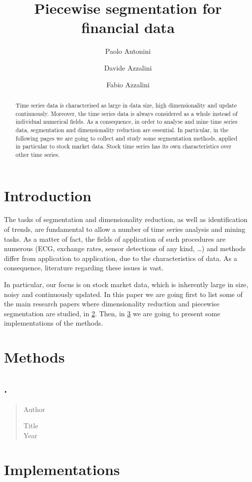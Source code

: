\documentclass[a4paper]{article}
\title{Piecewise segmentation for financial data}
\author{Paolo Antonini \and Davide Azzalini \and Fabio Azzalini}
\date{}
\newcommand{\newpaper}[1]{\subsection{\cite{#1}. \citetitle{#1}}

\begin{framed}\begin{quote}\begin{description}
	\item [Author]\citeauthor{#1}
	\item [Title]\citetitle{#1}
	\item [Year]\citedate{#1}
\end{description}\end{quote}\end{framed}}
\begin{document}
\maketitle
\begin{abstract}
Time series data is characterised as large in data size, high dimensionality and update continuously. Moreover, the time series data is always considered as a whole instead of individual numerical fields. As a consequence, in order to analyse and mine time series data, segmentation and dimensionality reduction are essential. In particular, in the following pages we are going to collect and study some segmentation methods, applied in particular to stock market data. Stock time series has its own characteristics over other time series. 
\end{abstract}

\section{Introduction}
The tasks of segmentation and dimensionality reduction, as well as identification of trends, are fundamental to allow a number of time series analysis and mining tasks. As a matter of fact, the fields of application of such procedures are numerous (ECG, exchange rates, sensor detections of any kind, \dots) and methods differ from application to application, due to the characteristics of data. As a consequence, literature regarding these issues is vast. 

In particular, our focus is on stock market data, which is inherently large in size, noisy and continuously updated. In this paper we are going first to list some of the main research papers where dimensionality reduction and piecewise segmentation are studied, in \cref{sec:methods}. Then, in \cref{sec:implementations} we are going to present some implementations of the methods. 


\section{Methods}\label{sec:methods}
 
\lipsum[1-3]

\newpaper{Yu2006} \lipsum[2-4]


\section{Implementations}\label{sec:implementations}
\end{document}
